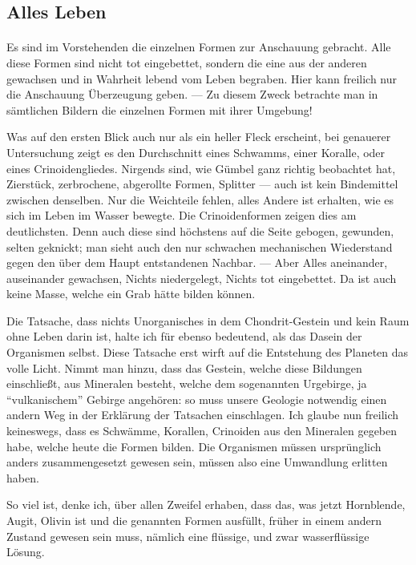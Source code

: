 \documentclass[a4paper, 12pt, oneside]{article}
\begin{document}
\subsection{Alles Leben}
\paragraph{}
Es sind im Vorstehenden die einzelnen Formen zur Anschauung gebracht. Alle diese Formen sind nicht tot eingebettet, sondern die eine aus der anderen gewachsen und in Wahrheit lebend vom Leben begraben. Hier kann freilich nur die Anschauung Überzeugung geben. — Zu diesem Zweck betrachte man in sämtlichen Bildern die einzelnen Formen mit ihrer Umgebung!

Was auf den ersten Blick auch nur als ein heller Fleck erscheint, bei genauerer Untersuchung zeigt es den Durchschnitt eines Schwamms, einer Koralle, oder eines Crinoidengliedes. Nirgends sind, wie Gümbel ganz richtig beobachtet hat, Zierstück, zerbrochene, abgerollte Formen, Splitter — auch ist kein Bindemittel zwischen denselben. Nur die Weichteile fehlen, alles Andere ist erhalten, wie es sich im Leben im Wasser bewegte. Die Crinoidenformen zeigen dies am deutlichsten. Denn auch diese sind höchstens auf die Seite gebogen, gewunden, selten geknickt; man sieht auch den nur schwachen mechanischen Wiederstand gegen den über dem Haupt entstandenen Nachbar. — Aber Alles aneinander, auseinander gewachsen, Nichts niedergelegt, Nichts tot eingebettet. Da ist auch keine Masse, welche ein Grab hätte bilden können.

Die Tatsache, dass nichts Unorganisches in dem Chondrit-Gestein und kein Raum ohne Leben darin ist, halte ich für ebenso bedeutend, als das Dasein der Organismen selbst. Diese Tatsache erst wirft auf die Entstehung des Planeten das volle Licht. Nimmt man hinzu, dass das Gestein, welche diese Bildungen einschließt, aus Mineralen besteht, welche dem sogenannten Urgebirge, ja "`vulkanischem"' Gebirge angehören: so muss unsere Geologie notwendig einen andern Weg in der Erklärung der Tatsachen einschlagen. Ich glaube nun freilich keineswegs, dass es Schwämme, Korallen, Crinoiden aus den Mineralen gegeben habe, welche heute die Formen bilden. Die Organismen müssen ursprünglich anders zusammengesetzt gewesen sein, müssen also eine Umwandlung erlitten haben.

So viel ist, denke ich, über allen Zweifel erhaben, dass das, was jetzt Hornblende, Augit, Olivin ist und die genannten Formen ausfüllt, früher in einem andern Zustand gewesen sein muss, nämlich eine flüssige, und zwar wasserflüssige Lösung.
\end{document}
